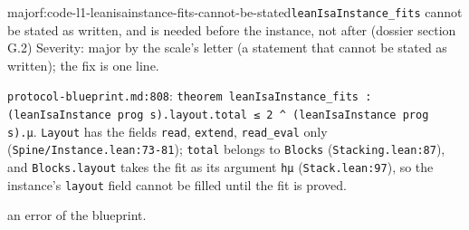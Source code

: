 \begin{finding}{major}{f:code-l1-leanisainstance-fits-cannot-be-stated}{\texttt{leanIsaInstance\_\allowbreak{}fits} cannot be stated as written, and is needed before the instance, not after (dossier section G.2)}
Severity: major by the scale's letter (a statement that cannot be stated as written); the fix is one line.

\texttt{protocol-{}blueprint.\allowbreak{}md:808}: \texttt{t\allowbreak{}h\allowbreak{}e\allowbreak{}o\allowbreak{}r\allowbreak{}e\allowbreak{}m\allowbreak{} l\allowbreak{}e\allowbreak{}a\allowbreak{}n\allowbreak{}I\allowbreak{}s\allowbreak{}a\allowbreak{}I\allowbreak{}n\allowbreak{}s\allowbreak{}t\allowbreak{}a\allowbreak{}n\allowbreak{}c\allowbreak{}e\allowbreak{}\_\allowbreak{}f\allowbreak{}i\allowbreak{}t\allowbreak{}s\allowbreak{} :\allowbreak{} (\allowbreak{}l\allowbreak{}e\allowbreak{}a\allowbreak{}n\allowbreak{}I\allowbreak{}s\allowbreak{}a\allowbreak{}I\allowbreak{}n\allowbreak{}s\allowbreak{}t\allowbreak{}a\allowbreak{}n\allowbreak{}c\allowbreak{}e\allowbreak{} p\allowbreak{}r\allowbreak{}o\allowbreak{}g\allowbreak{} s\allowbreak{})\allowbreak{}.\allowbreak{}l\allowbreak{}a\allowbreak{}y\allowbreak{}o\allowbreak{}u\allowbreak{}t\allowbreak{}.\allowbreak{}t\allowbreak{}o\allowbreak{}t\allowbreak{}a\allowbreak{}l\allowbreak{} ≤\allowbreak{} 2\allowbreak{} \textasciicircum{}\allowbreak{} (\allowbreak{}l\allowbreak{}e\allowbreak{}a\allowbreak{}n\allowbreak{}I\allowbreak{}s\allowbreak{}a\allowbreak{}I\allowbreak{}n\allowbreak{}s\allowbreak{}t\allowbreak{}a\allowbreak{}n\allowbreak{}c\allowbreak{}e\allowbreak{} p\allowbreak{}r\allowbreak{}o\allowbreak{}g\allowbreak{} s\allowbreak{})\allowbreak{}.\allowbreak{}μ}. \texttt{Layout} has the fields \texttt{read}, \texttt{extend}, \texttt{read\_\allowbreak{}eval} only (\texttt{Spine/\allowbreak{}Instance.\allowbreak{}lean:73-{}81}); \texttt{total} belongs to \texttt{Blocks} (\texttt{Stacking.\allowbreak{}lean:87}), and \texttt{Blocks.\allowbreak{}layout} takes the fit as its argument \texttt{hμ} (\texttt{Stack.\allowbreak{}lean:97}), so the instance's \texttt{layout} field cannot be filled until the fit is proved.

an error of the blueprint.


\end{finding}
